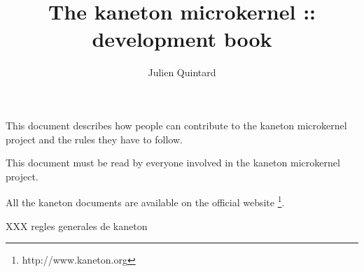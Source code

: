 %
%
%
%
%
%

%
%

\def\path{../..}

%
%



%
%

\rhead{}

%
%

\title{The kaneton microkernel :: development book
       \logos}

%
%

\author{\small{Julien Quintard}}

%
%



%
%

\maketitle

%
%

This document describes how people can contribute to the kaneton microkernel
project and the rules they have to follow.

This document must be read by everyone involved in the kaneton microkernel
project.

All the kaneton documents are available on
the official website
  \footnote{http://www.kaneton.org}.

%
%

\tableofcontents

%
%








%



%
%

XXX regles generales de kaneton

